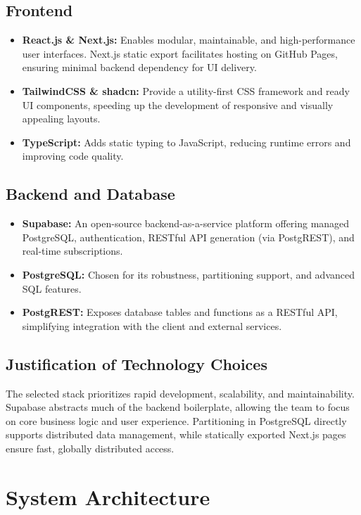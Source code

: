\documentclass[12pt,a4paper]{report}
\begin{document}
\section{Frontend}
\begin{itemize}
    \item \textbf{React.js \& Next.js:} Enables modular, maintainable, and high-performance user interfaces. Next.js static export facilitates hosting on GitHub Pages, ensuring minimal backend dependency for UI delivery.
    \item \textbf{TailwindCSS \& shadcn:} Provide a utility-first CSS framework and ready UI components, speeding up the development of responsive and visually appealing layouts.
    \item \textbf{TypeScript:} Adds static typing to JavaScript, reducing runtime errors and improving code quality.
\end{itemize}

\section{Backend and Database}
\begin{itemize}
    \item \textbf{Supabase:} An open-source backend-as-a-service platform offering managed PostgreSQL, authentication, RESTful API generation (via PostgREST), and real-time subscriptions.
    \item \textbf{PostgreSQL:} Chosen for its robustness, partitioning support, and advanced SQL features.
    \item \textbf{PostgREST:} Exposes database tables and functions as a RESTful API, simplifying integration with the client and external services.
\end{itemize}

\section{Justification of Technology Choices}
The selected stack prioritizes rapid development, scalability, and maintainability. Supabase abstracts much of the backend boilerplate, allowing the team to focus on core business logic and user experience. Partitioning in PostgreSQL directly supports distributed data management, while statically exported Next.js pages ensure fast, globally distributed access.

\chapter{System Architecture}
\end{document}

